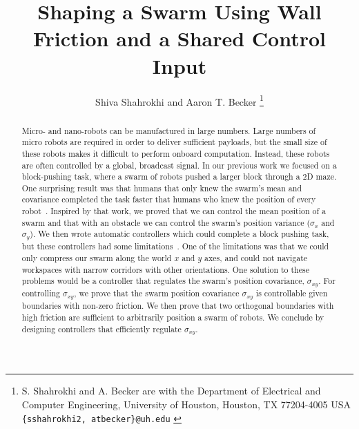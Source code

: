 \documentclass[letterpaper, 10 pt, conference]{ieeeconf}
\begin{document}


\title{\LARGE \bf 
Shaping a Swarm Using Wall Friction and a Shared Control Input
}
\author{Shiva Shahrokhi and  Aaron T. Becker%
\thanks{{S. Shahrokhi and A. Becker are with the Department of Electrical and Computer Engineering,  University of Houston, Houston, TX 77204-4005 USA {\tt\small  \{sshahrokhi2, atbecker\}@uh.edu}
}
} %
} %
\maketitle

\begin{abstract}

Micro- and nano-robots can be manufactured in large numbers. Large numbers of micro robots are required in order to deliver sufficient payloads, but the small size of these robots makes it difficult to perform onboard computation.  Instead, these robots are often controlled by a global, broadcast signal. 
In our previous work we focused on a block-pushing task, where a swarm of robots pushed a larger block through a 2D maze. One surprising result was that humans that only knew the swarm's mean and covariance completed the task faster that humans who knew the position of every robot~\cite{Becker2013b}. 
Inspired by that work, we proved that we can control the mean position of a swarm and that with an obstacle we can control the swarm's position variance ($\sigma_x$ and $\sigma_y$). 
We then wrote automatic controllers which could complete a block pushing task, but these controllers had some limitations~\cite{ShahrokhiIROS2015}. 
One of the limitations was that we could only compress our swarm along the world $x$ and $y$ axes, and could not navigate workspaces with narrow corridors with other orientations. 
One solution to these problems would be a controller that regulates the swarm's position covariance, $\sigma_{xy}$. 
For controlling $\sigma_{xy}$, we prove that the swarm position covariance $\sigma_{xy}$ is controllable given boundaries with non-zero friction. 
We then prove that two orthogonal boundaries with high friction are sufficient to arbitrarily position a swarm of robots. 
We conclude by designing controllers that efficiently regulate $\sigma_{xy}$.
\end{abstract}
\end{document}
